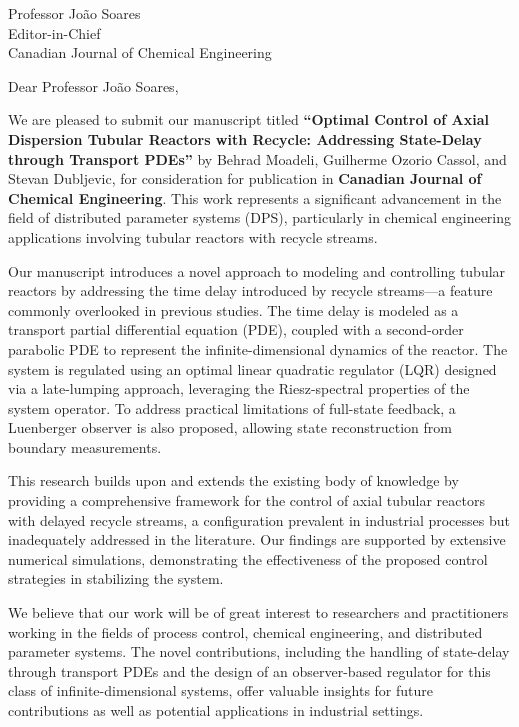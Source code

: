 \documentclass[11pt]{letter}
\begin{document}
\date{August 30, 2024}

\begin{letter}{Professor João Soares \\
Editor-in-Chief \\
Canadian Journal of Chemical Engineering}

\opening{Dear Professor João Soares,}

We are pleased to submit our manuscript titled \textbf{``Optimal Control of Axial Dispersion Tubular Reactors with Recycle: Addressing State-Delay through Transport PDEs''} by Behrad Moadeli, Guilherme Ozorio Cassol, and Stevan Dubljevic, for consideration for publication in \textbf{Canadian Journal of Chemical Engineering}. This work represents a significant advancement in the field of distributed parameter systems (DPS), particularly in chemical engineering applications involving tubular reactors with recycle streams.

Our manuscript introduces a novel approach to modeling and controlling tubular reactors by addressing the time delay introduced by recycle streams—a feature commonly overlooked in previous studies. The time delay is modeled as a transport partial differential equation (PDE), coupled with a second-order parabolic PDE to represent the infinite-dimensional dynamics of the reactor. The system is regulated using an optimal linear quadratic regulator (LQR) designed via a late-lumping approach, leveraging the Riesz-spectral properties of the system operator. To address practical limitations of full-state feedback, a Luenberger observer is also proposed, allowing state reconstruction from boundary measurements.

This research builds upon and extends the existing body of knowledge by providing a comprehensive framework for the control of axial tubular reactors with delayed recycle streams, a configuration prevalent in industrial processes but inadequately addressed in the literature. Our findings are supported by extensive numerical simulations, demonstrating the effectiveness of the proposed control strategies in stabilizing the system.

We believe that our work will be of great interest to researchers and practitioners working in the fields of process control, chemical engineering, and distributed parameter systems. The novel contributions, including the handling of state-delay through transport PDEs and the design of an observer-based regulator for this class of infinite-dimensional systems, offer valuable insights for future contributions as well as potential applications in industrial settings.


\end{letter}
\end{document}
